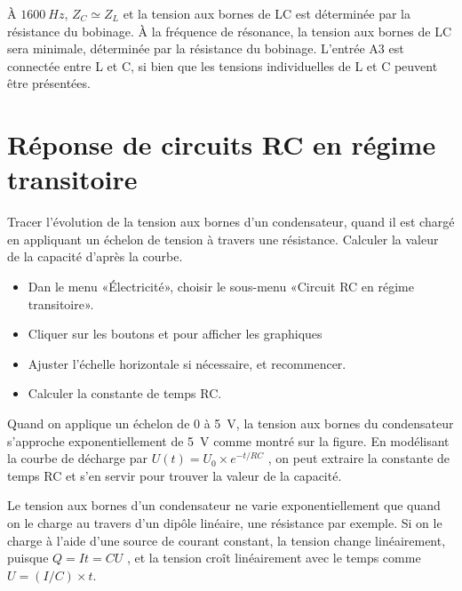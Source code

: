 \documentclass[a4paper,12pt,french]{sphinxmanual}
\let\sphinxpxdimen\pdfpxdimen\else\newdimen\sphinxpxdimen
\begin{document}
À \(1600~Hz\), \(Z_C \simeq Z_L\) et la tension aux bornes
de LC est déterminée par la résistance du bobinage. À la fréquence de
résonance, la tension aux bornes de LC sera minimale, déterminée par la
résistance du bobinage. L’entrée A3 est connectée entre L et C, si bien
que les tensions individuelles de L et C peuvent être présentées.


\section{Réponse de circuits RC en régime transitoire}
\label{\detokenize{4.4:reponse-de-circuits-rc-en-regime-transitoire}}\label{\detokenize{4.4::doc}}

Tracer l’évolution de la tension aux bornes d’un condensateur, quand il
est chargé en appliquant un échelon de tension à travers une résistance.
Calculer la valeur de la capacité d’après la courbe.

\noindent\sphinxincludegraphics[width=300\sphinxpxdimen]{{RCtransient}.pdf}
\noindent\sphinxincludegraphics[width=300\sphinxpxdimen]{{RCtransient}.pdf}

\begin{itemize}
\item {} 
Dan le menu «Électricité», choisir le sous-menu «Circuit RC en régime
transitoire».

\item {} 
Cliquer sur les boutons  et  pour
afficher les graphiques

\item {} 
Ajuster l’échelle horizontale si nécessaire, et recommencer.

\item {} 
Calculer la constante de temps RC.

\end{itemize}


Quand on applique un échelon de 0 à 5 V, la tension aux bornes du
condensateur s’approche exponentiellement de 5 V comme montré sur la
figure. En modélisant la courbe de décharge par
\(U(t) = U_0 \times e^{- t/RC}\) , on
peut extraire la constante de temps RC et s’en servir pour trouver la
valeur de la capacité.

Le tension aux bornes d’un condensateur ne varie exponentiellement que
quand on le charge au travers d’un dipôle linéaire, une résistance par
exemple. Si on le charge à l’aide d’une source de courant constant, la
tension change linéairement, puisque \(Q = It = CU\) , et la tension
croît linéairement avec le temps comme
\(U = (I/C) \times t\).
\end{document}
